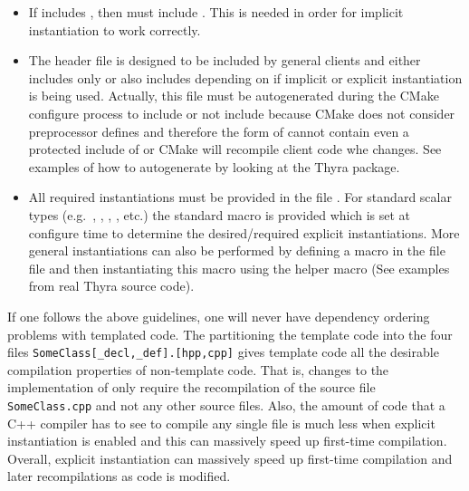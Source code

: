 \begin{itemize}
\begin{itemize}
\item If  includes
  , then  must
  include .  This is needed in order for
  implicit instantiation to work correctly.

\item The header file  is designed to be included
  by general clients and either includes only
   or also includes 
  depending on if implicit or explicit instantiation is being used.
  Actually, this file must be autogenerated during the CMake configure
  process to include or not include  because
  CMake does not consider preprocessor defines and therefore the form
  of  cannot contain even a protected include of
   or CMake will recompile client code whe
   changes.  See examples of how to
  autogenerate  by looking at the Thyra package.

\item All required instantiations must be provided in the file
  .  For standard scalar types (e.g.\ ,
  , , ,
  etc.) the standard macro
   is
  provided which is set at configure time to determine the
  desired/required explicit instantiations.  More general
  instantiations can also be performed by defining a macro in the file
   file and then instantiating this macro
  using the helper macro
   (See
  examples from real Thyra source code).

\end{itemize}

If one follows the above guidelines, one will never have dependency
ordering problems with templated code.  The partitioning the template
code into the four files \texttt{SomeClass[\_decl,\_def].[hpp,cpp]}
gives template code all the desirable compilation properties of
non-template code.  That is, changes to the implementation of
 only require the recompilation of the source file
\texttt{SomeClass.cpp} and not any other source files.  Also, the
amount of code that a C++ compiler has to see to compile any single
 file is much less when explicit instantiation is enabled
and this can massively speed up first-time compilation.  Overall,
explicit instantiation can massively speed up first-time compilation
and later recompilations as code is modified.


\end{itemize}


